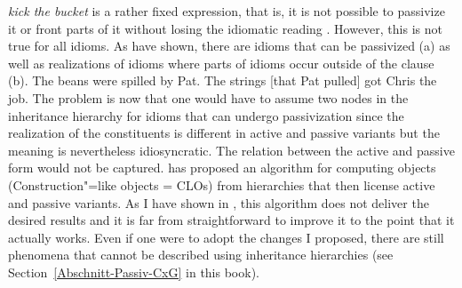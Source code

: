 \begin{exe}
\begin{xlist}[iv.]
\begin{exe}
\begin{xlist}[iv.]
\emph{kick the bucket} is a rather fixed expression, that is, it is not possible to passivize it or front parts of it without losing
the idiomatic reading \citep*[]{NSW94a}. However, this is not true for all idioms. As
\citet*[]{NSW94a} have shown, there are idioms that can be passivized (a) as well as
realizations of idioms where parts of idioms occur outside of the clause (b). 
\eal
\ex The beans were spilled by Pat.
\ex The strings [that Pat pulled] got Chris the job.
\zl
%
%
The problem is now that one would have to assume two nodes in the inheritance hierarchy for idioms
that can undergo passivization since the realization of the constituents is different in active and
passive variants but the meaning is nevertheless idiosyncratic. The relation between the active and passive form would not be captured.
\citet{Kay2002a} has proposed an algorithm for computing objects (Construction"=like objects = CLOs) from hierarchies that then license active and passive variants. As I
have shown in \citet[Section~3]{Mueller2006d}, this algorithm does not deliver the desired results and it is far from straightforward to improve it to the point
that it actually works. Even if one were to adopt the changes I proposed, there are still phenomena that cannot be described using inheritance hierarchies
(see Section~\ref{Abschnitt-Passiv-CxG} in this book).


\end{xlist}
\end{exe}
\end{xlist}
\end{exe}
